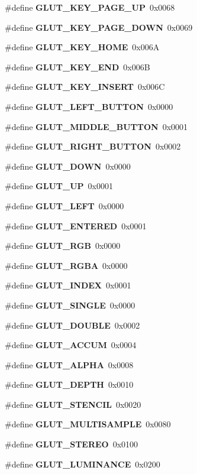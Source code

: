 \begin{DoxyCompactItemize}
\item 
\#define {\bf G\+L\+U\+T\+\_\+\+K\+E\+Y\+\_\+\+P\+A\+G\+E\+\_\+\+U\+P}~0x0068
\item 
\#define {\bf G\+L\+U\+T\+\_\+\+K\+E\+Y\+\_\+\+P\+A\+G\+E\+\_\+\+D\+O\+W\+N}~0x0069
\item 
\#define {\bf G\+L\+U\+T\+\_\+\+K\+E\+Y\+\_\+\+H\+O\+M\+E}~0x006\+A
\item 
\#define {\bf G\+L\+U\+T\+\_\+\+K\+E\+Y\+\_\+\+E\+N\+D}~0x006\+B
\item 
\#define {\bf G\+L\+U\+T\+\_\+\+K\+E\+Y\+\_\+\+I\+N\+S\+E\+R\+T}~0x006\+C
\item 
\#define {\bf G\+L\+U\+T\+\_\+\+L\+E\+F\+T\+\_\+\+B\+U\+T\+T\+O\+N}~0x0000
\item 
\#define {\bf G\+L\+U\+T\+\_\+\+M\+I\+D\+D\+L\+E\+\_\+\+B\+U\+T\+T\+O\+N}~0x0001
\item 
\#define {\bf G\+L\+U\+T\+\_\+\+R\+I\+G\+H\+T\+\_\+\+B\+U\+T\+T\+O\+N}~0x0002
\item 
\#define {\bf G\+L\+U\+T\+\_\+\+D\+O\+W\+N}~0x0000
\item 
\#define {\bf G\+L\+U\+T\+\_\+\+U\+P}~0x0001
\item 
\#define {\bf G\+L\+U\+T\+\_\+\+L\+E\+F\+T}~0x0000
\item 
\#define {\bf G\+L\+U\+T\+\_\+\+E\+N\+T\+E\+R\+E\+D}~0x0001
\item 
\#define {\bf G\+L\+U\+T\+\_\+\+R\+G\+B}~0x0000
\item 
\#define {\bf G\+L\+U\+T\+\_\+\+R\+G\+B\+A}~0x0000
\item 
\#define {\bf G\+L\+U\+T\+\_\+\+I\+N\+D\+E\+X}~0x0001
\item 
\#define {\bf G\+L\+U\+T\+\_\+\+S\+I\+N\+G\+L\+E}~0x0000
\item 
\#define {\bf G\+L\+U\+T\+\_\+\+D\+O\+U\+B\+L\+E}~0x0002
\item 
\#define {\bf G\+L\+U\+T\+\_\+\+A\+C\+C\+U\+M}~0x0004
\item 
\#define {\bf G\+L\+U\+T\+\_\+\+A\+L\+P\+H\+A}~0x0008
\item 
\#define {\bf G\+L\+U\+T\+\_\+\+D\+E\+P\+T\+H}~0x0010
\item 
\#define {\bf G\+L\+U\+T\+\_\+\+S\+T\+E\+N\+C\+I\+L}~0x0020
\item 
\#define {\bf G\+L\+U\+T\+\_\+\+M\+U\+L\+T\+I\+S\+A\+M\+P\+L\+E}~0x0080
\item 
\#define {\bf G\+L\+U\+T\+\_\+\+S\+T\+E\+R\+E\+O}~0x0100
\item 
\#define {\bf G\+L\+U\+T\+\_\+\+L\+U\+M\+I\+N\+A\+N\+C\+E}~0x0200

\end{DoxyCompactItemize}
